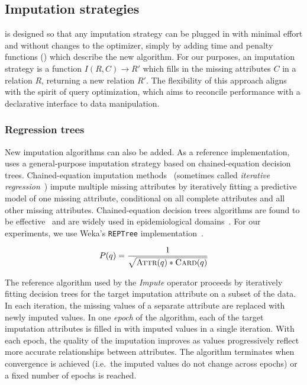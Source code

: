 \subsection{Imputation strategies}
\label{sec:imputation}

\ProjectName{} is designed so that any imputation strategy
can be plugged in with minimal effort and without changes to the optimizer, simply by adding
time and penalty functions () which describe the new algorithm.
For our purposes, an imputation strategy is a function $I(R, C) \rightarrow R'$ which fills in the missing
attributes $C$ in a relation $R$, returning a new relation $R'$.
The flexibility of this approach aligns with the spirit of query optimization, which aims to
reconcile performance with a declarative interface to data manipulation.

\subsubsection{Regression trees}

New imputation algorithms can also be added. As a reference implementation, \ProjectName{} uses a general-purpose imputation strategy
based on chained-equation decision trees.  Chained-equation
imputation methods~\cite{vanbuuren2011mice} (sometimes called \textit{iterative
regression}~\cite{gelman2006data}) impute multiple missing attributes by iteratively fitting
a predictive model of one missing attribute, conditional on all complete attributes
and all other missing attributes. Chained-equation decision trees algorithms are found to be
effective~\cite{akande2015empirical} and are widely used in epidemiological
domains~\cite{burgette2010multiple}. For our experiments, we use Weka's {\tt REPTree}
implementation~\cite{witten2016data}.

\[P(q) = \frac{1}{\sqrt{ \textsc{Attr}(q) * \textsc{Card}(q)}}\]

The reference algorithm used by the \textit{Impute} operator proceeds by iteratively fitting
decision trees for the target imputation attribute on a subset of the data. In each
iteration, the missing values of a separate attribute are replaced with newly imputed values.
In one {\it epoch} of the algorithm, each of the target imputation
attributes is filled in with imputed values in a single iteration.
With each epoch, the quality of the imputation improves as values progressively
reflect more accurate relationships between attributes. The algorithm terminates when
convergence is achieved (i.e.\ the imputed values do not change across epochs) or a fixed
number of epochs is reached. 

